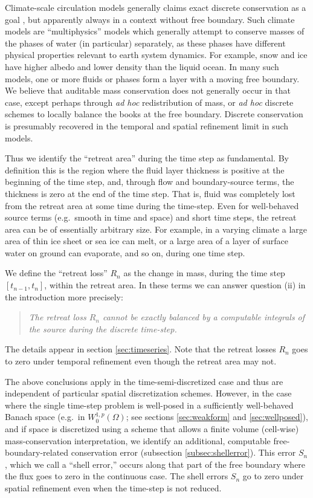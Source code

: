 \documentclass[final,leqno,onefignum,onetabnum]{siamltex1213bueler}
\begin{document}
Climate-scale circulation models generally claims exact discrete conservation as a goal \cite{Thuburn2008}, but apparently always in a context without free boundary.  Such climate models are ``multiphysics'' models which generally attempt to conserve masses of the phases of water (in particular) separately, as these phases have different physical properties relevant to earth system dynamics.  For example, snow and ice have higher albedo and lower density than the liquid ocean.  In many such models, one or more fluids or phases form a layer with a moving free boundary.  We believe that auditable mass conservation does not generally occur in that case, except perhaps through \emph{ad hoc} redistribution of mass, or \emph{ad hoc} discrete schemes to locally balance the books at the free boundary.  Discrete conservation is presumably recovered in the temporal and spatial refinement limit in such models.

Thus we identify the ``retreat area'' during the time step as fundamental.  By definition this is the region where the fluid layer thickness is positive at the beginning of the time step, and, through flow and boundary-source terms, the thickness is zero at the end of the time step.  That is, fluid was completely lost from the retreat area at some time during the time-step.  Even for well-behaved source terms (e.g.~smooth in time and space) and short time steps, the retreat area can be of essentially arbitrary size.  For example, in a varying climate a large area of thin ice sheet or sea ice can melt, or a large area of a layer of surface water on ground can evaporate, and so on, during one time step.

We define the ``retreat loss'' $R_n$ as the change in mass, during the time step $[t_{n-1},t_n]$, within the retreat area.  In these terms we can answer question (ii) in the introduction more precisely:
\begin{quote}
  \emph{The retreat loss $R_n$ cannot be exactly balanced by a computable integrals of the source during the discrete time-step.}
\end{quote}
The details appear in section \ref{sec:timeseries}.  Note that the retreat losses $R_n$ goes to zero under temporal refinement even though the retreat area may not.

The above conclusions apply in the time-semi-discretized case and thus are independent of particular spatial discretization schemes.  However, in the case where the single time-step problem is well-posed in a sufficiently well-behaved Banach space (e.g.~in $W_0^{1,p}(\Omega)$; see sections \ref{sec:weakform} and \ref{sec:wellposed}), and if space is discretized using a scheme that allows a finite volume (cell-wise) mass-conservation interpretation, we identify an additional, computable free-boundary-related conservation error (subsection \ref{subsec:shellerror}).  This error $S_n$, which we call a ``shell error,'' occurs along that part of the free boundary where the flux goes to zero in the continuous case.  The shell errors $S_n$ go to zero under spatial refinement even when the time-step is not reduced.
\end{document}
